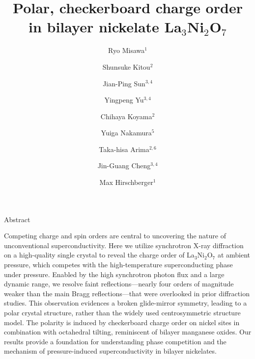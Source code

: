 \documentclass[aps,12pt,floatfix,longbibliography,a4paper]{revtex4-2}
\newcommand{\LNO}{La$_3$Ni$_2$O$_7$}
\begin{document}
\title[]{Polar, checkerboard charge order in bilayer nickelate \LNO{}}


\author{Ryo Misawa$^{1}$}
\author{Shunsuke Kitou$^{2}$}
\author{Jian-Ping Sun$^{3,4}$}
\author{Yingpeng Yu$^{3,4}$}
\author{Chihaya Koyama$^{2}$}
\author{Yuiga Nakamura$^{5}$}
\author{Taka-hisa Arima$^{2,6}$}
\author{Jin-Guang Cheng$^{3,4}$}
\author{Max Hirschberger$^{1}$}


\maketitle
\newpage

\begin{center}
\Large{Abstract}
\end{center}

Competing charge and spin orders are central to uncovering the nature of unconventional superconductivity. Here we utilize synchrotron X-ray diffraction on a high-quality single crystal to reveal the charge order of \LNO{} at ambient pressure, which competes with the high-temperature superconducting phase under pressure. Enabled by the high synchrotron photon flux and a large dynamic range, we resolve faint reflections---nearly four orders of magnitude weaker than the main Bragg reflections---that were overlooked in prior diffraction studies. This observation evidences a broken glide-mirror symmetry, leading to a polar crystal structure, rather than the widely used centrosymmetric structure model. The polarity is induced by checkerboard charge order on nickel sites in combination with octahedral tilting, reminiscent of bilayer manganese oxides. Our results provide a foundation for understanding phase competition and the mechanism of pressure-induced superconductivity in bilayer nickelates.
\end{document}
